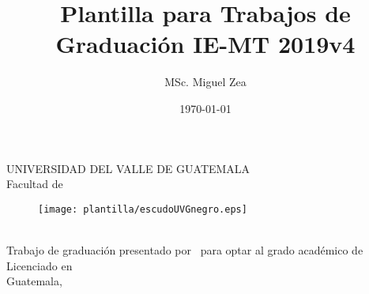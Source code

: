 \documentclass[11pt, letterpaper, twoside, openright]{report}
\title{Plantilla para Trabajos de Graduación IE-MT 2019v4}
\author{MSc. Miguel Zea}
\date{\today}
\begin{document}
\ifdefined\printver
    \let\CAPportada\undefined
\fi 

\ifdefined\CAPportada
    \cleardoublepage{}
	\pagecolor{uvg-green}
	\thispagestyle{empty}

	\color{white}
	\noindent \hrulefill \par
	\vspace{0.1in}
	\noindent \Huge \nohyphens{\titulotesis} \par
	\noindent \hrulefill \par
	\noindent
	\LARGE \nombreestudiante

	\begin{figure}[b!]
	\end{figure}
	\restoregeometry
\fi

\ifdefined\CAPcaratula
	\newpage
    \cleardoublepage{}
	\pagecolor{white}
	\color{black}
	\setcounter{page}{1}
	\thispagestyle{empty}
	\begin{center}
		\LARGE UNIVERSIDAD DEL VALLE DE GUATEMALA\\
		\LARGE Facultad de \uvgfacultad \\[0.75cm]
	\end{center}
	\begin{figure}[h]
		\begin{center}
		\texttt{[image: plantilla/escudoUVGnegro.eps]}
		\vspace{0.5in}
		\end{center}
	\end{figure}
	\begin{center}
		\Large \textbf{\nohyphens{\titulotesis}} \\
		\vfill
		\Large \nohyphens{Trabajo de graduación presentado por \nombreestudiante \ para optar al grado académico de Licenciado en \uvgcarrera} \\
		\vfill
		\large Guatemala, \\
		\vspace{1em}
		\anoentrega
	\end{center}
    
\end{document}
